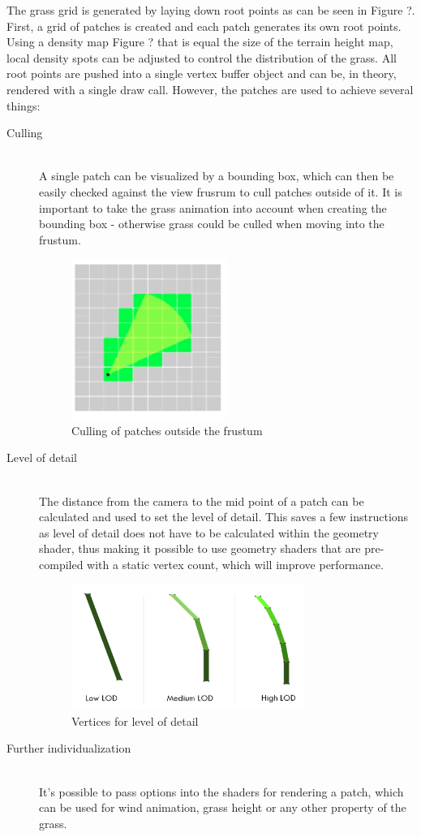 \documentclass[conference]{acmsiggraph}
\begin{document}
The grass grid is generated by laying down root points as can be seen in Figure {?}. First, a grid of patches is created and each patch generates its own root points. Using a density map {Figure ?} that is equal the size of the terrain height map, local density spots can be adjusted to control the distribution of the grass. All root points are pushed into a single vertex buffer object and can be, in theory, rendered with a single draw call. However, the patches are used to achieve several things:

\begin{description}
  \item[Culling] \hfill \\
  A single patch can be visualized by a bounding box, which can then be easily checked against the view frusrum to cull patches outside of it. It is important to take the grass animation into account when creating the bounding box - otherwise grass could be culled when moving into the frustum.
   \begin{figure}[ht]
   \centering
   \includegraphics[width=2.0in]{images/culling}
   \caption{Culling of patches outside the frustum}
 \end{figure}    
  
  \item[Level of detail] \hfill \\
  The distance from the camera to the mid point of a patch can be calculated and used to set the level of detail. This saves a few instructions as level of detail does not have to be calculated within the geometry shader, thus making it possible to use geometry shaders that are pre-compiled with a static vertex count, which will improve performance.

 \begin{figure}[ht]
   \centering
   \includegraphics[width=3.0in]{images/lod}
   \caption{Vertices for level of detail}
 \end{figure}  
  
  \item[Further individualization] \hfill \\
	It's possible to pass options into the shaders for rendering a patch, which can be used for wind animation, grass height or any other property of the grass.
\end{description}
\end{document}
